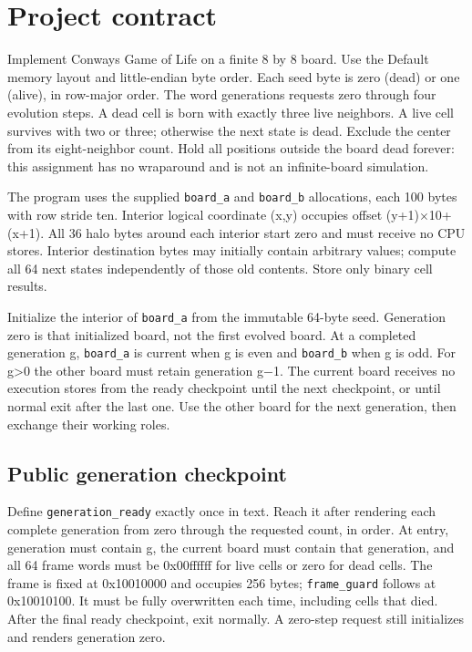 \section{Project contract}\label{008-life-generations-assignment-evolve-life-with-a-stable-source-generation}

Implement Conway\textquotesingle s Game of Life on a finite 8 by 8
board. Use the Default memory layout and little-endian byte order. Each
seed byte is zero (dead) or one (alive), in row-major order. The word
generations requests zero through four evolution steps. A dead cell is
born with exactly three live neighbors. A live cell survives with two or
three; otherwise the next state is dead. Exclude the center from its
eight-neighbor count. Hold all positions outside the board dead forever:
this assignment has no wraparound and is not an infinite-board
simulation.

The program uses the supplied \texttt{board\_a} and \texttt{board\_b}
allocations, each 100 bytes with row stride ten. Interior logical
coordinate (x,y) occupies offset (y+1)\ensuremath{\times}10+(x+1). All 36 halo bytes
around each interior start zero and must receive no CPU stores. Interior
destination bytes may initially contain arbitrary values; compute all 64
next states independently of those old contents. Store only binary cell
results.

Initialize the interior of \texttt{board\_a} from the immutable 64-byte
seed. Generation zero is that initialized board, not the first evolved
board. At a completed generation g, \texttt{board\_a} is current when g
is even and \texttt{board\_b} when g is odd. For g\textgreater0 the
other board must retain generation g\ensuremath{-}1. The current board receives no
execution stores from the ready checkpoint until the next checkpoint, or
until normal exit after the last one. Use the other board for the next
generation, then exchange their working roles.

\subsection{Public generation
  checkpoint}\label{008-life-generations-assignment-public-generation-checkpoint}

Define \texttt{generation\_ready} exactly once in text. Reach it after
rendering each complete generation from zero through the requested
count, in order. At entry, generation must contain g, the current board
must contain that generation, and all 64 frame words must be 0x00ffffff
for live cells or zero for dead cells. The frame is fixed at 0x10010000
and occupies 256 bytes; \texttt{frame\_guard} follows at 0x10010100. It
must be fully overwritten each time, including cells that died. After
the final ready checkpoint, exit normally. A zero-step request still
initializes and renders generation zero.


